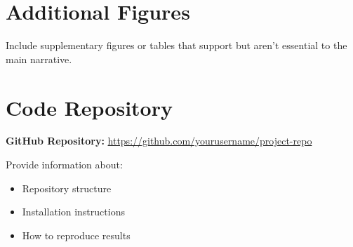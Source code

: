 \documentclass[11pt,a4paper]{article}
\begin{document}
\newpage
\appendix
\section{Additional Figures}
\label{app:figures}

Include supplementary figures or tables that support but aren't essential to the main narrative.

\section{Code Repository}
\label{app:code}

\noindent
\textbf{GitHub Repository:} \url{https://github.com/yourusername/project-repo}

\noindent
Provide information about:
\begin{itemize}
    \item Repository structure
    \item Installation instructions
    \item How to reproduce results
\end{itemize}
\end{document}

